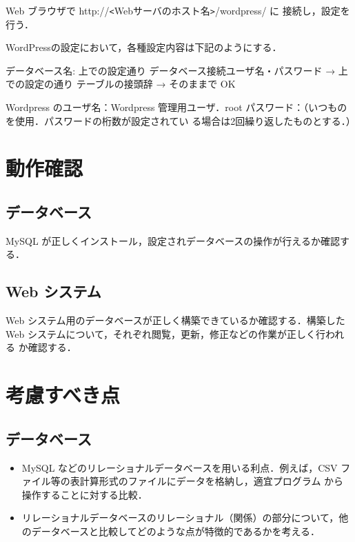 Web ブラウザで http://\verb+<+Webサーバのホスト名\verb+>+/wordpress/ に
接続し，設定を行う．

WordPressの設定において，各種設定内容は下記のようにする．

\begin{cli}
データベース名: 上での設定通り
データベース接続ユーザ名・パスワード
  → 上での設定の通り
テーブルの接頭辞 → そのままで OK

Wordpress のユーザ名：Wordpress 管理用ユーザ．root
            パスワード：（いつものを使用．パスワードの桁数が設定されてい
            る場合は2回繰り返したものとする．）

\end{cli}



\clearpage
\section{動作確認}

\subsection*{データベース}
MySQL が正しくインストール，設定されデータベースの操作が行えるか確認する．

\subsection*{Web システム}
%
Web システム用のデータベースが正しく構築できているか確認する．構築した 
Web システムについて，それぞれ閲覧，更新，修正などの作業が正しく行われる
か確認する．

\section{考慮すべき点}

\subsection*{データベース}
\begin{itemize}
 \item MySQL などのリレーショナルデータべースを用いる利点．例えば，CSV
       ファイル等の表計算形式のファイルにデータを格納し，適宜プログラム
       から操作することに対する比較．
 \item リレーショナルデータベースのリレーショナル（関係）の部分について，他のデータベースと比較してどのような点が特徴的であるかを考える．
\end{itemize}

